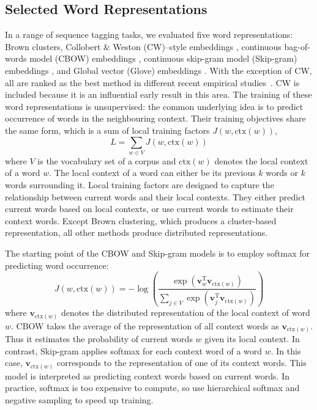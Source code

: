 \subsection{Selected Word Representations}
In a range of sequence tagging tasks, we evaluated five word representations: 
Brown clusters, Collobert \& Weston (CW)--style embeddings \cite{collobert2011natural}, 
continuous bag-of-words model (CBOW) embeddings \cite{Mikolov13}, 
continuous skip-gram model (Skip-gram) embeddings \cite{Mikolov13NIPS}, 
and Global vector (Glove) embeddings \cite{pennington2014glove}. 
With the exception of CW, all are ranked as the best method in different recent empirical studies~\cite{turian2010word,pennington2014glove}. CW is included because it is an influential early result in this area. The training of these word representations is unsupervised: the common underlying idea is to predict occurrence of words in the neighbouring context. Their training objectives share the same form, which is a sum of local training factors $J(w, \text{ctx}(w))$, 
\begin{displaymath}
L = \sum_{w \in V} J(w, \text{ctx}(w))
\end{displaymath}
where $V$ is the vocabulary set of a corpus and $\text{ctx}(w)$ denotes the local context of a word $w$. The local context of a word can either be its previous $k$ words or $k$ words surrounding it. Local training factors are designed to capture the relationship between current words and their local contexts. They either predict current words based on local contexts, or use current words to estimate their context words. Except Brown clustering, which produces a cluster-based representation, all other methods produce distributed representations.

The starting point of the CBOW and Skip-gram models is to employ softmax for predicting word occurrence:
\begin{displaymath}
J(w, \text{ctx}(w)) = - \log \left( \frac{\exp(\mathbf{v}_w^{\text{T}} \mathbf{v}_{\text{ctx}(w)})}{ \sum_{j \in V} \exp(\mathbf{v}_j^{\text{T}} \mathbf{v}_{\text{ctx}(w)})} \right)
\end{displaymath}
where $\mathbf{v}_{\text{ctx}(w)}$ denotes the distributed representation of the local context of word $w$. CBOW takes the average of the representation of all context words as $\mathbf{v}_{\text{ctx}(w)}$. Thus it estimates the probability of current words $w$ given its local context. In contrast, Skip-gram applies softmax for each context word of a word $w$. In this case, $\mathbf{v}_{\text{ctx}(w)}$ corresponds to the representation of one of its context words. This model is interpreted as predicting context words based on current words. In practice, softmax is too expensive to compute, so  use hierarchical softmax and negative sampling to speed up training.

